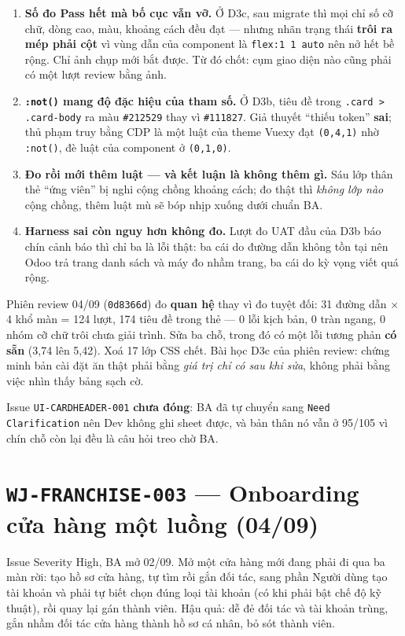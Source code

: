 \begin{enumerate}
\item \textbf{Số đo Pass hết mà bố cục vẫn vỡ.} Ở D3c, sau migrate thì mọi chỉ số cỡ chữ,
  dòng cao, màu, khoảng cách đều đạt --- nhưng nhãn trạng thái \textbf{trôi ra mép phải cột}
  vì vùng dẫn của component là \texttt{flex:1 1 auto} nên nở hết bề rộng. Chỉ ảnh chụp mới
  bắt được. Từ đó chốt: cụm giao diện nào cũng phải có một lượt review bằng ảnh.
\item \textbf{\texttt{:not()} mang độ đặc hiệu của tham số.} Ở D3b, tiêu đề trong
  \texttt{.card > .card-body} ra màu \texttt{\#212529} thay vì \texttt{\#111827}. Giả thuyết
  ``thiếu token'' \textbf{sai}; thủ phạm truy bằng CDP là một luật của theme Vuexy đạt
  \texttt{(0,4,1)} nhờ \texttt{:not()}, đè luật của component ở \texttt{(0,1,0)}.
\item \textbf{Đo rồi mới thêm luật --- và kết luận là không thêm gì.} Sáu lớp thân thẻ
  ``ứng viên'' bị nghi cộng chồng khoảng cách; đo thật thì \emph{không lớp nào} cộng chồng,
  thêm luật mù sẽ bóp nhịp xuống dưới chuẩn BA.
\item \textbf{Harness sai còn nguy hơn không đo.} Lượt đo UAT đầu của D3b báo chín cảnh báo
  thì chỉ ba là lỗi thật: ba cái do đường dẫn không tồn tại nên Odoo trả trang danh sách và
  máy đo nhầm trang, ba cái do kỳ vọng viết quá rộng.
\end{enumerate}

Phiên review 04/09 (\texttt{0d8366d}) đo \textbf{quan hệ} thay vì đo tuyệt đối: 31 đường dẫn
$\times$ 4 khổ màn = 124 lượt, 174 tiêu đề trong thẻ --- 0 lỗi kịch bản, 0 tràn ngang, 0 nhóm
cỡ chữ trôi chưa giải trình. Sửa ba chỗ, trong đó có một lỗi tương phản \textbf{có sẵn}
(3,74 lên 5,42). Xoá 17 lớp CSS chết. Bài học D3c của phiên review: chứng minh bản cài đặt ăn
thật phải bằng \emph{giá trị chỉ có sau khi sửa}, không phải bằng việc nhìn thấy bảng sạch cờ.

Issue \texttt{UI-CARDHEADER-001} \textbf{chưa đóng}: BA đã tự chuyển sang
\texttt{Need Clarification} nên Dev không ghi sheet được, và bản thân nó vẫn ở 95/105 vì chín
chỗ còn lại đều là câu hỏi treo chờ BA.

\section{\texttt{WJ-FRANCHISE-003} --- Onboarding cửa hàng một luồng (04/09)}

Issue Severity High, BA mở 02/09. Mở một cửa hàng mới đang phải đi qua ba màn rời: tạo hồ sơ
cửa hàng, tự tìm rồi gắn đối tác, sang phần Người dùng tạo tài khoản và phải tự biết chọn
đúng loại tài khoản (có khi phải bật chế độ kỹ thuật), rồi quay lại gán thành viên. Hậu quả:
dễ đẻ đối tác và tài khoản trùng, gắn nhầm đối tác cửa hàng thành hồ sơ cá nhân, bỏ sót thành
viên.

